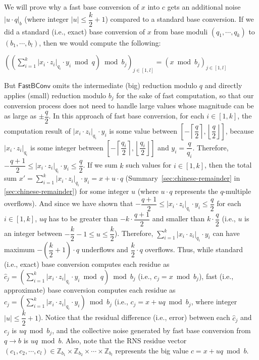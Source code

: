 \begin{myproof}

We will prove why a fast base conversion of $x$ into $c$ gets an additional noise $|u\cdot q|_b$ (where integer $|u| \leq \dfrac{k}{2}+1$) compared to a standard base conversion. If we did a standard (i.e., exact) base conversion of $x$ from base moduli $(q_1, \cdots, q_k)$ to $(b_1, \cdots, b_l)$, then we would compute the following:

$\left( \left( \sum\limits_{i=1}^{k} |x_i \cdot z_i|_{q_i} \cdot y_i \bmod q \right) \bmod b_j \right)_{j \in [1,l]} = \left( x \bmod b_j \right)_{j \in [1,l]}$

But $\textsf{FastBConv}$ omits the intermediate (big) reduction modulo $q$ and directly applies (small) reduction modulo $b_j$ for the sake of fast computation, so that our conversion process does not need to handle large values whose magnitude can be as large as $\pm\dfrac{q}{2}$. In this approach of fast base conversion, for each $i \in [1, k]$, the computation result of $|x_i \cdot z_i|_{q_i} \cdot y_i$ is some value between $\left[-\left\lceil\dfrac{q}{2}\right\rceil, \left\lfloor\dfrac{q}{2}\right\rfloor\right]$, because $|x_i \cdot z_i|_{q_i}$ is some integer between $\left[-\left\lceil\dfrac{q_i}{2}\right\rceil, \left\lfloor\dfrac{q_i}{2}\right\rfloor\right]$ and $y_i = \dfrac{q}{q_i}$. Therefore, $-\dfrac{q+1}{2} \leq |x_i \cdot z_i|_{q_i} \cdot y_i \leq \dfrac{q}{2}$. If we sum $k$ such values for $i \in [1, k]$, then the total sum $x' = \sum\limits_{i=1}^{k} |x_i \cdot z_i|_{q_i} \cdot y_i = x + u\cdot q$ (Summary~\ref*{sec:chinese-remainder} in \autoref{sec:chinese-remainder}) for some integer $u$ (where $u\cdot q$ represents the $q$-multiple overflows). And since we have shown that $-\dfrac{q+1}{2} \leq |x_i \cdot z_i|_{q_i} \cdot y_i \leq \dfrac{q}{2}$ for each $i \in [1, k]$, $uq$ has to be greater than $-k\cdot\dfrac{q+1}{2}$ and smaller than $k\cdot\dfrac{q}{2}$ (i.e., $u$ is an integer between $-\dfrac{k}{2} - 1 \leq u \leq \dfrac{k}{2}$). Therefore, $\sum\limits_{i=1}^{k} |x_i \cdot z_i|_{q_i} \cdot y_i$ can have maximum $-\left(\dfrac{k}{2} + 1\right)\cdot q$ underflows and $\dfrac{k}{2}\cdot q$ overflows. Thus, while standard (i.e., exact) base conversion computes each residue as $\hat{c}_j = \left(\sum\limits_{i=1}^{k} |x_i \cdot z_i|_{q_i} \cdot y_i \bmod q\right) \bmod b_j$ (i.e., $c_j = x \bmod b_j$), fast (i.e., approximate) base conversion computes each residue as $c_j = \left(\sum\limits_{i=1}^{k} |x_i \cdot z_i|_{q_i} \cdot y_i\right) \bmod b_j$ (i.e., $c_j = x + uq \bmod b_j$, where integer $|u| \leq \dfrac{k}{2} + 1$). Notice that the residual difference (i.e., error) between each $\hat{c}_j$ and $c_j$ is $uq \bmod b_j$, and the collective noise generated by fast base conversion from $q \rightarrow  b$ is  $uq \bmod b$. Also, note that the RNS residue vector $(c_1, c_2, \cdots, c_l) \in \mathbb{Z}_{b_1} \times \mathbb{Z}_{b_2} \times \cdots \times \mathbb{Z}_{b_l}$ represents the big value $c = x + uq \bmod b$. 


\end{myproof}
